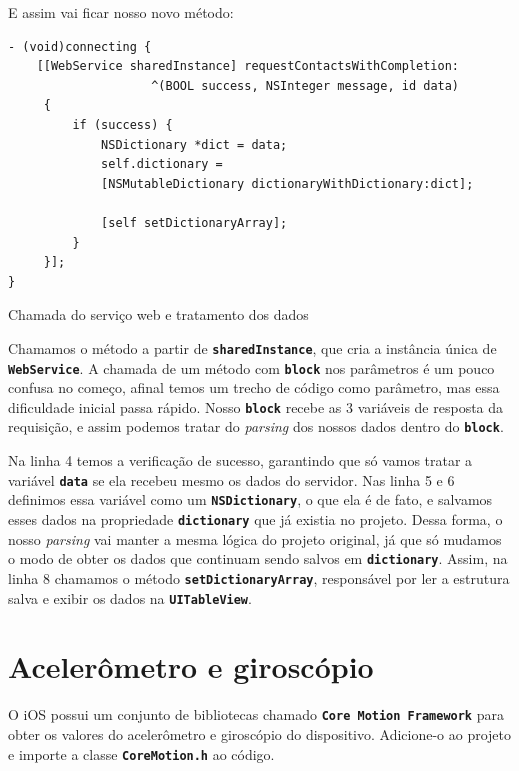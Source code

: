 \documentclass[a4paper,12pt,brazil,oneside]{book}
\begin{document}
E assim vai ficar nosso novo método:

\begin{listing}[H]
\begin{verbatim}
- (void)connecting {
    [[WebService sharedInstance] requestContactsWithCompletion:
                    ^(BOOL success, NSInteger message, id data)
     {
         if (success) {
             NSDictionary *dict = data;
             self.dictionary = 
             [NSMutableDictionary dictionaryWithDictionary:dict];
             
             [self setDictionaryArray];
         }
     }];
}
\end{verbatim}
\caption{Chamada do serviço web e tratamento dos dados}
\end{listing}


Chamamos o método a partir de \texttt{\textbf{sharedInstance}}, que cria a instância única de\\ \texttt{\textbf{WebService}}. A chamada de um método com \texttt{\textbf{block}} nos parâmetros é um pouco confusa no começo, afinal temos um trecho de código como parâmetro, mas essa dificuldade inicial passa rápido. Nosso \texttt{\textbf{block}} recebe as 3 variáveis de resposta da requisição, e assim podemos tratar  do \emph{parsing} dos nossos dados dentro do \texttt{\textbf{block}}.

Na linha 4 temos a verificação de sucesso, garantindo que só vamos tratar a variável \texttt{\textbf{data}} se ela recebeu mesmo os dados do servidor. Nas linha 5 e 6 definimos essa variável como um \texttt{\textbf{NSDictionary}}, o que ela é de fato, e salvamos esses dados na propriedade \texttt{\textbf{dictionary}} que já existia no projeto. Dessa forma, o nosso \emph{parsing} vai manter a mesma lógica do projeto original, já que só mudamos o modo de obter os dados que continuam sendo salvos em \texttt{\textbf{dictionary}}. Assim, na linha 8 chamamos o método \texttt{\textbf{setDictionaryArray}}, responsável por ler a estrutura salva e exibir os dados na \texttt{\textbf{UITableView}}.

\section{Acelerômetro e giroscópio}


O iOS possui um conjunto de bibliotecas chamado \texttt{\textbf{Core Motion Framework}} para obter os valores do acelerômetro e giroscópio do dispositivo. Adicione-o ao projeto e importe a classe \texttt{\textbf{CoreMotion.h}} ao código.
\end{document}
